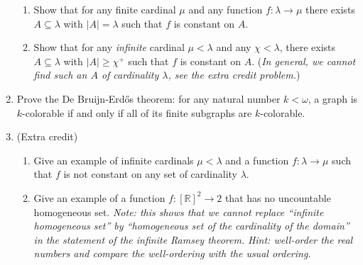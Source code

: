 \documentclass{amsart}
\theoremstyle{definition}
\begin{document}
\begin{enumerate}
  \begin{enumerate}
  \item Show that for any finite cardinal $\mu$ and any function $f: \lambda \to \mu$ there exists $A \subseteq \lambda$ with $|A| = \lambda$ such that $f$ is constant on $A$.
  \item Show that for any \emph{infinite} cardinal $\mu < \lambda$ and any $\chi < \lambda$, there exists $A \subseteq \lambda$ with $|A| \ge \chi^+$ such that $f$ is constant on $A$. (\emph{In general, we cannot find such an $A$ of cardinality $\lambda$, see the extra credit problem.})
  \end{enumerate}
\item Prove the De Bruijn-Erdős theorem: for any natural number $k < \omega$, a graph is $k$-colorable if and only if all of its finite subgraphs are $k$-colorable.
\item (Extra credit)
  \begin{enumerate}
  \item Give an example of infinite cardinals $\mu < \lambda$ and a function $f: \lambda \to \mu$ such that $f$ is not constant on any set of cardinality $\lambda$.
  \item Give an example of a function $f: [\mathbb{R}]^2 \to 2$ that has no uncountable homogeneous set. \emph{Note: this shows that we cannot replace ``infinite homogeneous set'' by ``homogeneous set of the cardinality of the domain'' in the statement of the infinite Ramsey theorem.} \emph{Hint: well-order the real numbers and compare the well-ordering with the usual ordering.}
  \end{enumerate}
\end{enumerate}



\end{document}

